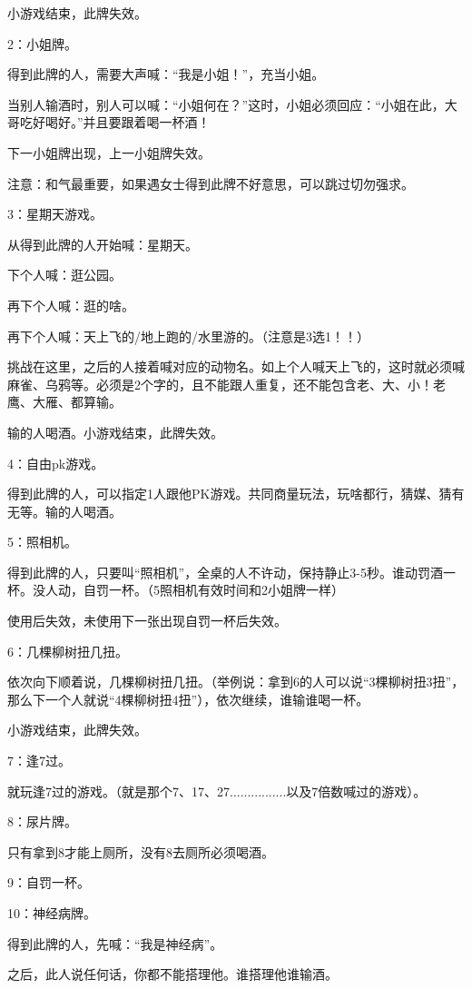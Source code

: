 \documentclass{ctexbook}
\begin{document}
小游戏结束，此牌失效。

2：小姐牌。

得到此牌的人，需要大声喊：“我是小姐！”，充当小姐。

当别人输酒时，别人可以喊：“小姐何在？”这时，小姐必须回应：“小姐在此，大哥吃好喝好。”并且要跟着喝一杯酒！

下一小姐牌出现，上一小姐牌失效。

注意：和气最重要，如果遇女士得到此牌不好意思，可以跳过切勿强求。

3：星期天游戏。

从得到此牌的人开始喊：星期天。

下个人喊：逛公园。

再下个人喊：逛的啥。

再下个人喊：天上飞的/地上跑的/水里游的。（注意是3选1！！）

挑战在这里，之后的人接着喊对应的动物名。如上个人喊天上飞的，这时就必须喊麻雀、乌鸦等。必须是2个字的，且不能跟人重复，还不能包含老、大、小！老鹰、大雁、都算输。

输的人喝酒。小游戏结束，此牌失效。



4：自由pk游戏。

得到此牌的人，可以指定1人跟他PK游戏。共同商量玩法，玩啥都行，猜媒、猜有无等。输的人喝酒。

5：照相机。

得到此牌的人，只要叫“照相机”，全桌的人不许动，保持静止3-5秒。谁动罚酒一杯。没人动，自罚一杯。（5照相机有效时间和2小姐牌一样）

使用后失效，未使用下一张出现自罚一杯后失效。

6：几棵柳树扭几扭。

依次向下顺着说，几棵柳树扭几扭。（举例说：拿到6的人可以说“3棵柳树扭3扭”，那么下一个人就说“4棵柳树扭4扭”），依次继续，谁输谁喝一杯。

小游戏结束，此牌失效。



7：逢7过。

就玩逢7过的游戏。（就是那个7、17、27................以及7倍数喊过的游戏）。

8：尿片牌。

只有拿到8才能上厕所，没有8去厕所必须喝酒。

9：自罚一杯。

10：神经病牌。

得到此牌的人，先喊：“我是神经病”。

之后，此人说任何话，你都不能搭理他。谁搭理他谁输酒。
\end{document}
